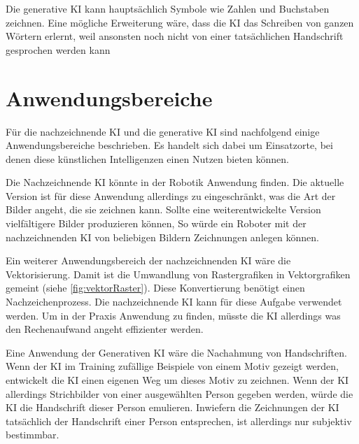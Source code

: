 Die generative KI kann hauptsächlich Symbole wie Zahlen und Buchstaben zeichnen.
Eine mögliche Erweiterung wäre, dass die KI das Schreiben von ganzen Wörtern
erlernt, weil ansonsten noch nicht von einer tatsächlichen Handschrift
gesprochen werden kann


\section{Anwendungsbereiche}\label{chap:d_anwendung} Für die nachzeichnende KI
und die generative KI sind nachfolgend einige Anwendungsbereiche beschrieben. Es
handelt sich dabei um Einsatzorte, bei denen diese künstlichen Intelligenzen
einen Nutzen bieten können.

Die Nachzeichnende KI könnte in der Robotik Anwendung finden. Die aktuelle
Version ist für diese Anwendung allerdings zu eingeschränkt, was die Art der
Bilder angeht, die sie zeichnen kann. Sollte eine weiterentwickelte Version
vielfältigere Bilder produzieren können, So würde ein Roboter mit der
nachzeichnenden KI von beliebigen Bildern Zeichnungen anlegen können.

Ein weiterer Anwendungsbereich der nachzeichnenden KI wäre die Vektorisierung.
Damit ist die Umwandlung von Rastergrafiken in Vektorgrafiken gemeint (siehe
\autoref{fig:vektorRaster}). Diese Konvertierung benötigt einen
Nachzeichenprozess. Die nachzeichnende KI kann für diese Aufgabe verwendet
werden. Um in der Praxis Anwendung zu finden, müsste die KI allerdings was den
Rechenaufwand angeht effizienter werden.

\label{fig:vektorRaster}

Eine Anwendung der Generativen KI wäre die Nachahmung von Handschriften. Wenn
der KI im Training zufällige Beispiele von einem Motiv gezeigt werden,
entwickelt die KI einen eigenen Weg um dieses Motiv zu zeichnen. Wenn der KI
allerdings Strichbilder von einer ausgewählten Person gegeben werden, würde die
KI die Handschrift dieser Person emulieren. Inwiefern die Zeichnungen der KI
tatsächlich der Handschrift einer Person entsprechen, ist allerdings nur
subjektiv bestimmbar.
